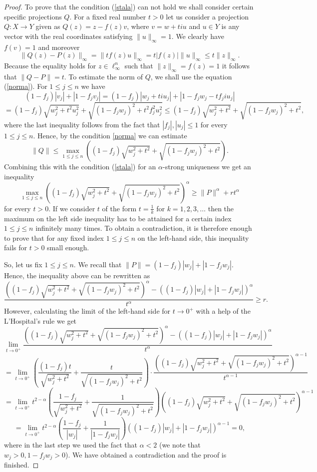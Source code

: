 \documentclass[12pt, reqno]{amsart}
\theoremstyle{definition}
\theoremstyle{remark}
\numberwithin{equation}{section}
\begin{document}
\begin{proof}
To prove that the condition (\ref{stala}) can not hold we shall consider certain specific projections $Q$. For a fixed real number $t>0$ let us consider a projection $Q: X \to Y$ given as $Q(z)=z-f(z)v$, where $v=w+tiu$ and $u \in Y$ is any vector with the real coordinates satisfying $\|u\|_{\infty}=1$. We clearly have $f(v)=1$ and moreover
$$\|Q(z)-P(z)\|_{\infty}=\|tf(z)u\|_{\infty}=t|f(z)| \|u\|_{\infty} \leq t \|z\|_{\infty}.$$
Because the equality holds for $z \in \ell_{\infty}^n$ such that $\|z\|_{\infty}=f(z)=1$ it follows that $\|Q-P\| = t$. To estimate the norm of $Q$, we shall use the equation (\ref{norma}). For $1 \leq j \leq n$ we have
$$(1-f_j)|v_j| + |1-f_jv_j| = (1-f_j)|w_j + tiu_j| + |1-f_jw_j - tf_j i u_j|$$
$$=(1-f_j)\sqrt{w_j^2 + t^2u^2_j} + \sqrt{(1-f_jw_j)^2 + t^2f_j^2u_j^2} \leq (1-f_j)\sqrt{w_j^2 + t^2} + \sqrt{(1-f_jw_j)^2 + t^2},$$
where the last inequality follows from the fact that $|f_j|, |u_j| \leq 1$ for every $1 \leq j \leq n$. Hence, by the condition \eqref{norma} we can estimate
$$\|Q\| \leq \max_{1 \leq j \leq n} \left ( (1-f_j)\sqrt{w_j^2 + t^2} + \sqrt{(1-f_jw_j)^2 + t^2} \right ).$$
Combining this with the condition (\ref{stala}) for an $\alpha$-strong uniqueness we get an inequality
$$\max_{1 \leq j \leq n} \left ( (1-f_j)\sqrt{w_j^2 + t^2} + \sqrt{(1-f_jw_j)^2 + t^2} \right )^{\alpha} \geq \|P\|^{\alpha} + rt^{\alpha}$$
for every $t > 0$. If we consider $t$ of the form $t=\frac{1}{k}$ for $k=1, 2, 3, \ldots$ then the maximum on the left side inequality has to be attained for a certain index $1 \leq j \leq n$ infinitely many times. To obtain a contradiction, it is therefore enough to prove that for any fixed index $1 \leq j \leq n$ on the left-hand side, this inequality fails for $t>0$ small enough.

So, let us fix $1 \leq j \leq n$. We recall that $\|P\| = (1-f_j)|w_j| + |1-f_jw_j|$. Hence, the inequality above can be rewritten as
$$\frac{\left ((1-f_j)\sqrt{w_j^2 + t^2} + \sqrt{(1-f_jw_j)^2 + t^2}\right )^{\alpha}  - \left ( (1-f_j)|w_j| + |1-f_jw_j| \right )^{\alpha}}{t^{\alpha}} \geq r.$$
However, calculating the limit of the left-hand side for $t \to 0^{+}$ with a help of the L'Hospital's rule we get
$$\lim_{t \to 0^+} \frac{\left ((1-f_j)\sqrt{w_j^2 + t^2} + \sqrt{(1-f_jw_j)^2 + t^2}\right )^{\alpha}  - \left ( (1-f_j)|w_j| + |1-f_jw_j| \right )^{\alpha}}{t^{\alpha}}$$
$$=\lim_{t \to 0^+}\left (  \frac{(1-f_j)t}{\sqrt{w^2_j+t^2}} + \frac{t}{\sqrt{(1-f_jw_j)^2 + t^2}} \right ) \cdot \frac{\left ((1-f_j)\sqrt{w_j^2 + t^2} + \sqrt{(1-f_jw_j)^2 + t^2}\right )^{\alpha-1}}{t^{\alpha-1}} $$
$$=\lim_{t \to 0^+} t^{2 - \alpha} \left (  \frac{1-f_j}{\sqrt{w^2_j+t^2}} + \frac{1}{\sqrt{(1-f_jw_j)^2 + t^2}} \right ) \left ((1-f_j)\sqrt{w_j^2 + t^2} + \sqrt{(1-f_jw_j)^2 + t^2}\right )^{\alpha-1}$$
$$=\lim_{t \to 0^+} t^{2 - \alpha} \left ( \frac{1-f_j}{|w_j|} + \frac{1}{|1-f_jw_j|} \right ) \left ((1-f_j)|w_j| + |1-f_jw_j|\right )^{\alpha-1}=0,$$
where in the last step we used the fact that $\alpha < 2$ (we note that $w_j>0, 1-f_jw_j>0$). We have obtained a contradiction and the proof is finished.

\end{proof}
\end{document}
